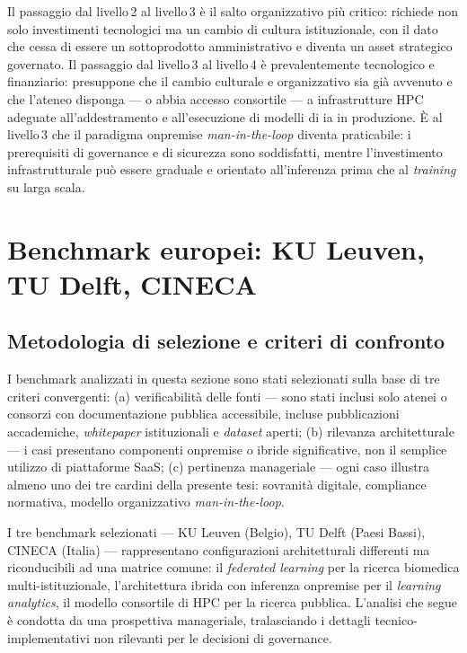 Il passaggio dal livello\,2 al livello\,3 è il salto organizzativo più critico: richiede
non solo investimenti tecnologici ma un cambio di cultura istituzionale, con il dato che
cessa di essere un sottoprodotto amministrativo e diventa un asset strategico
governato. Il passaggio dal livello\,3 al livello\,4 è prevalentemente tecnologico e
finanziario: presuppone che il cambio culturale e organizzativo sia già avvenuto e che
l'ateneo disponga --- o abbia accesso consortile --- a infrastrutture HPC adeguate
all'addestramento e all'esecuzione di modelli di \gls{ia} in produzione. È al livello\,3 che
il paradigma \gls{onpremise} \textit{man-in-the-loop} diventa praticabile: i
prerequisiti di governance e di sicurezza sono soddisfatti, mentre l'investimento
infrastrutturale può essere graduale e orientato all'inferenza prima che al
\textit{training} su larga scala.

\section{Benchmark europei: KU Leuven, TU Delft, CINECA}
\label{sec:benchmark-europei}

\subsection{Metodologia di selezione e criteri di confronto}

I benchmark analizzati in questa sezione sono stati selezionati sulla base di tre criteri
convergenti: (a) verificabilità delle fonti --- sono stati inclusi solo atenei o
consorzi con documentazione pubblica accessibile, incluse pubblicazioni accademiche,
\textit{whitepaper} istituzionali e \textit{dataset} aperti; (b) rilevanza
architetturale --- i casi presentano componenti \gls{onpremise} o ibride
significative, non il semplice utilizzo di piattaforme SaaS; (c) pertinenza
manageriale --- ogni caso illustra almeno uno dei tre cardini della presente tesi:
sovranità digitale, compliance normativa, modello organizzativo \textit{man-in-the-loop}.

I tre benchmark selezionati --- KU Leuven (Belgio), TU Delft (Paesi Bassi), CINECA
(Italia) --- rappresentano configurazioni architetturali differenti ma riconducibili ad
una matrice comune: il \textit{federated learning} per la ricerca biomedica
multi-istituzionale, l'architettura ibrida con inferenza \gls{onpremise} per il
\textit{learning analytics}, il modello consortile di HPC per la ricerca pubblica.
L'analisi che segue è condotta da una prospettiva manageriale, tralasciando i dettagli
tecnico-implementativi non rilevanti per le decisioni di governance.

